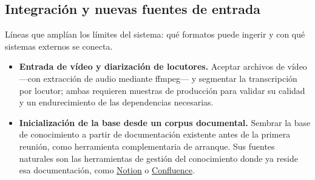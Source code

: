 \subsection{Integración y nuevas fuentes de entrada}

Líneas que amplían los límites del sistema: qué formatos puede ingerir y con qué sistemas externos
se conecta.

\begin{itemize}
  \item \textbf{Entrada de vídeo y diarización de locutores.} Aceptar archivos de vídeo —con
        extracción de audio mediante ffmpeg— y segmentar la transcripción por locutor; ambas
        requieren muestras de producción para validar su calidad y un endurecimiento de las
        dependencias necesarias.

  \item \textbf{Inicialización de la base desde un corpus documental.} Sembrar la base de
        conocimiento a partir de documentación existente antes de la primera reunión, como
        herramienta complementaria de arranque. Sus fuentes naturales son las herramientas de
        gestión del conocimiento donde ya reside esa documentación, como
        \href{https://www.notion.so}{Notion} o \href{https://www.atlassian.com/software/confluence}{Confluence}.
\end{itemize}

